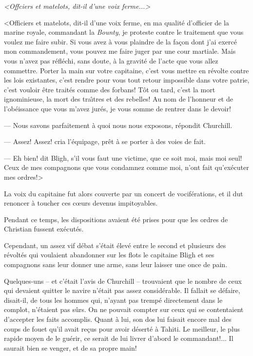 \pageinsert
\vskip 15cm
\centerline{}
\smallskip
\centerline{\it <Offciers et matelots, dit-il d'une voix ferme...>}
\vfill
\endinsert

<Officiers et matelots, dit-il d'une voix ferme, en ma
qualit\'e d'officier de la marine royale, commandant
la {\sl Bounty}, je proteste contre le traitement que
vous voulez me faire subir. Si vous avez \`a vous plaindre
de la fa\c{c}on dont j'ai exerc\'e mon commandement,
vous pouvez me faire juger par une cour martiale.
Mais vous n'avez pas r\'efl\'echi, sans doute, \`a la
gravit\'e de l'acte que vous allez commettre. Porter
la main sur votre capitaine, c'est vous mettre
en r\'evolte contre les lois existantes, c'est rendre
pour vous tout retour impossible dans votre patrie,
c'est vouloir \^etre trait\'es comme des forbans!
T\^ot ou tard, c'est la mort ignominieuse, la mort
des tra{\^\i}tres et des rebelles! Au nom de l'honneur
et de l'ob\'eissance que vous m'avez jur\'es, je vous
somme de rentrer dans le devoir!

--- Nous savons parfaitement \`a quoi nous nous exposons,
r\'e\-pon\-dit Churchill.

--- Assez! Assez! cria l'\'equipage,
pr\^et \`a se porter \`a des voies de fait.

--- Eh bien! dit Bligh, s'il vous faut une victime, que ce
soit moi, mais moi seul! Ceux de mes compagnons que vous
condamnez comme moi, n'ont fait qu'ex\'ecuter mes ordres!>

La voix du capitaine fut alors couverte par un concert
de vocif\'erations, et il dut renoncer \`a toucher ces
c{\oe}urs devenus impitoyables.

Pendant ce temps, les dispositions avaient \'et\'e prises
pour que les ordres de Christian fussent ex\'ecut\'es.

Cependant, un assez vif d\'ebat s'\'etait \'elev\'e entre
le second et plusieurs des r\'evolt\'es qui voulaient
abandonner sur les flots le capitaine Bligh et ses compagnons
sans leur donner une arme, sans leur laisser une once de pain.

Quelques-uns -- et c'\'etait l'avis de Churchill -- trouvaient
que le nombre de ceux qui devaient quitter le navire n'\'etait
pas assez consid\'erable. Il fallait se d\'efaire, disait-il,
de tous les hommes qui, n'ayant pas tremp\'e directement dans
le complot, n'\'etaient pas s\^urs.
On ne pouvait compter sur ceux qui se contentaient d'accepter
les faits accomplis. Quant \`a lui, son dos lui faisait encore
mal des coups de fouet qu'il avait re\c{c}us pour avoir
d\'esert\'e \`a Tahiti. Le meilleur, le plus rapide moyen
de le gu\'erir, ce serait de lui livrer d'abord le commandant!...
Il saurait bien se venger, et de sa propre main!

